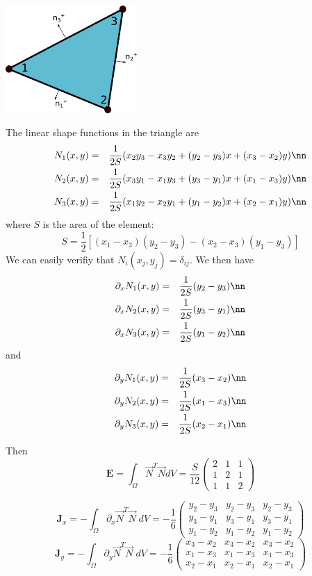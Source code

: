 
\begin{center}
\includegraphics[width=5cm]{images/dgfem/dgelts_p1}
\end{center}

The linear shape functions in the triangle are 
\begin{eqnarray}
N_1(x,y) &=& \frac{1}{2S} ( x_2y_3-x_3y_2+(y_2-y_3)x+(x_3-x_2)y   ) \nn\\
N_2(x,y) &=& \frac{1}{2S} ( x_3y_1-x_1y_3+(y_3-y_1)x+(x_1-x_3)y   ) \nn\\
N_3(x,y) &=& \frac{1}{2S} ( x_1y_2-x_2y_1+(y_1-y_2)x+(x_2-x_1)y   ) \nn
\end{eqnarray}
where $S$ is the area of the element:
\[
S= \frac{1}{2} [(x_1-x_3)(y_2-y_3)-(x_2-x_3)(y_1-y_3)]
\]
We can easily verifiy that $N_i(x_j,y_j)=\delta_{ij}$. We then have 
\begin{eqnarray}
\partial_x N_1(x,y) &=& \frac{1}{2S}  (y_2-y_3) \nn\\
\partial_x N_2(x,y) &=& \frac{1}{2S}  (y_3-y_1) \nn\\
\partial_x N_3(x,y) &=& \frac{1}{2S}  (y_1-y_2) \nn
\end{eqnarray}
and
\begin{eqnarray}
\partial_y N_1(x,y) &=& \frac{1}{2S}  (x_3-x_2) \nn\\
\partial_y N_2(x,y) &=& \frac{1}{2S}  (x_1-x_3) \nn\\
\partial_y N_3(x,y) &=& \frac{1}{2S}  (x_2-x_1) \nn
\end{eqnarray}

Then 
\[
{\bm E} = \int_\Omega \vec{N}^T \vec{N} dV 
=\frac{S}{12} 
\left(
\begin{array}{ccc}
2 &1 &1\\ 
1 &2 &1\\
1 &1 &2
\end{array}
\right)
\]

\[
{\bm J}_x = - \int_{\Omega} \partial_x \vec{N}^T \vec{N}   \; dV 
=-\frac{1}{6}
\left(
\begin{array}{ccc}
y_2-y_3 & y_2-y_3 & y_2-y_3 \\
y_3-y_1 & y_3-y_1 & y_3-y_1 \\
y_1-y_2 & y_1-y_2 & y_1-y_2 
\end{array}
\right)
\]
\[
{\bm J}_y =  - \int_{\Omega} \partial_y \vec{N}^T \vec{N}   \; dV  
=-\frac{1}{6} 
\left(
\begin{array}{ccc}
x_3-x_2 & x_3-x_2 & x_3-x_2 \\
x_1-x_3 & x_1-x_3 & x_1-x_3 \\
x_2-x_1 & x_2-x_1 & x_2-x_1 
\end{array}
\right)
\]




